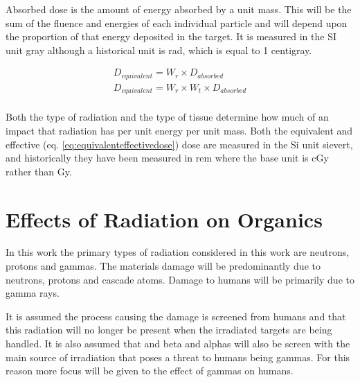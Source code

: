Absorbed dose is the amount of energy absorbed by a unit mass.  This will be the sum of the fluence and energies of each individual particle and will depend upon the proportion of that energy deposited in the target.  It is measured in the SI unit \gls{gray} although a historical unit is \gls{rad}, which is equal to 1 centigray.

\begin{equation}
\begin{split}
D_{equivalent} = W_{r} \times D_{absorbed} \\
D_{equivalent} = W_{r} \times W_{t} \times D_{absorbed} \\
\label{eq:equivalenteffectivedose}
\end{split}
\end{equation}

Both the type of radiation and the type of tissue determine how much of an impact that radiation has per unit energy per unit mass.  Both the equivalent and effective (eq. \ref{eq:equivalenteffectivedose}) dose are measured in the Si unit \gls{sievert}, and historically they have been measured in \gls{rem} where the base unit is cGy rather than Gy.






\FloatBarrier




\section{Effects of Radiation on Organics}
\label{section:effectsofradiationorg}

In this work the primary types of radiation considered in this work are neutrons, protons and gammas.  The materials damage will be predominantly due to neutrons, protons and cascade atoms.  Damage to humans will be primarily due to gamma rays. 

It is assumed the process causing the damage is screened from humans and that this radiation will no longer be present when the irradiated targets are being handled.  It is also assumed that and beta and alphas will also be screen with the main source of irradiation that poses a threat to humans being gammas.  For this reason more focus will be given to the effect of gammas on humans.



